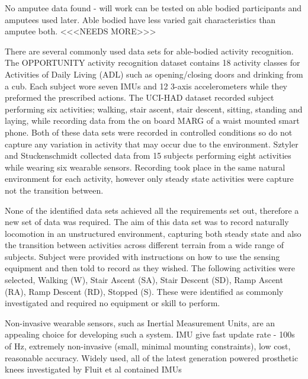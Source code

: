 \documentclass[sensors,article,submit,moreauthors,pdftex]{Definitions/mdpi}
\begin{document}
No amputee data found - will work can be tested on able bodied participants and amputees used later. Able bodied have less varied gait characteristics than amputee both. <<<NEEDS MORE>>>

There are several commonly used data sets for able-bodied activity recognition. The OPPORTUNITY activity recognition dataset\cite{roggan2010} contains 18 activity classes for Activities of Daily Living (ADL) such as opening/closing doors and drinking from a cub. Each subject wore seven IMUs and 12 3-axis accelerometers while they preformed the prescribed actions. The UCI-HAD dataset\cite{Anguita2013} recorded subject performing six activities; walking, stair ascent, stair descent, sitting, standing and laying, while recording data from the on board MARG of a waist mounted smart phone. Both of these data sets were recorded in controlled conditions so do not capture any variation in activity that may occur due to the environment. Sztyler and Stuckenschmidt collected data from 15 subjects performing eight activities while wearing six wearable sensors. Recording took place in the same natural environment for each activity, however only steady state activities were capture not the transition between.\cite{Sztyler2017} 

None of the identified data sets achieved all the requirements set out, therefore a new set of data was required. The aim of this data set was to record naturally locomotion in an unstructured environment, capturing both steady state and also the transition between activities across different terrain from a wide range of subjects. Subject were provided with instructions on how to use the sensing equipment and then told to record as they wished. The following activities were selected, Walking (W), Stair Ascent (SA), Stair Descent (SD), Ramp Ascent (RA), Ramp Descent (RD), Stopped (S). These were identified as commonly investigated and required no equipment or skill to perform. 

Non-invasive wearable sensors, such as Inertial Measurement Units, are an appealing choice for developing such a system. IMU give fast update rate - 100s of Hz, extremely non-invasive (small, minimal mounting constraints), low cost, reasonable accuracy. Widely used, all of the latest generation powered prosthetic knees investigated by Fluit et al contained IMUs \cite{Fluit2020}
\end{document}
